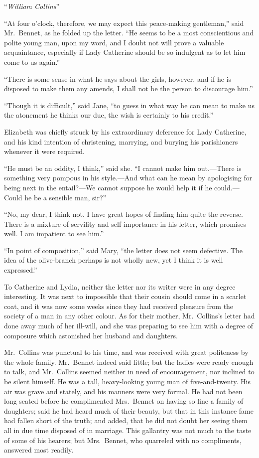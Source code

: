 \medskip
``\emph{William Collins}''
\bigskip

``At four o'clock, therefore, we may expect this peace-making
gentleman,'' said Mr.\ Bennet, as he folded up the letter.  ``He
seems to be a most conscientious and polite young man, upon
my word, and I doubt not will prove a valuable acquaintance,
especially if Lady Catherine should be so indulgent as to let
him come to us again.''

``There is some sense in what he says about the girls, however,
and if he is disposed to make them any amends, I shall not be
the person to discourage him.''

``Though it is difficult,'' said Jane, ``to guess in what way he can
mean to make us the atonement he thinks our due, the wish is
certainly to his credit.''

Elizabeth was chiefly struck by his extraordinary deference for
Lady Catherine, and his kind intention of christening, marrying,
and burying his parishioners whenever it were required.

``He must be an oddity, I think,'' said she.  ``I cannot make him
out.---There is something very pompous in his style.---And what
can he mean by apologising for being next in the entail?---We
cannot suppose he would help it if he could.---Could he be a
sensible man, sir?''

``No, my dear, I think not.  I have great hopes of finding him
quite the reverse.  There is a mixture of servility and
self-importance in his letter, which promises well.  I am
impatient to see him.''

``In point of composition,'' said Mary, ``the letter does not seem
defective.  The idea of the olive-branch perhaps is not wholly
new, yet I think it is well expressed.''

To Catherine and Lydia, neither the letter nor its writer were
in any degree interesting.  It was next to impossible that their
cousin should come in a scarlet coat, and it was now some
weeks since they had received pleasure from the society of a
man in any other colour.  As for their mother, Mr.\ Collins's
letter had done away much of her ill-will, and she was preparing
to see him with a degree of composure which astonished her
husband and daughters.

Mr.\ Collins was punctual to his time, and was received with
great politeness by the whole family.  Mr.\ Bennet indeed said
little; but the ladies were ready enough to talk, and Mr.\ Collins
seemed neither in need of encouragement, nor inclined to be
silent himself.  He was a tall, heavy-looking young man of
five-and-twenty.  His air was grave and stately, and his
manners were very formal.  He had not been long seated before
he complimented Mrs.\ Bennet on having so fine a family of
daughters; said he had heard much of their beauty, but that in
this instance fame had fallen short of the truth; and added,
that he did not doubt her seeing them all in due time disposed
of in marriage.  This gallantry was not much to the taste of
some of his hearers; but Mrs.\ Bennet, who quarreled with no
compliments, answered most readily.


